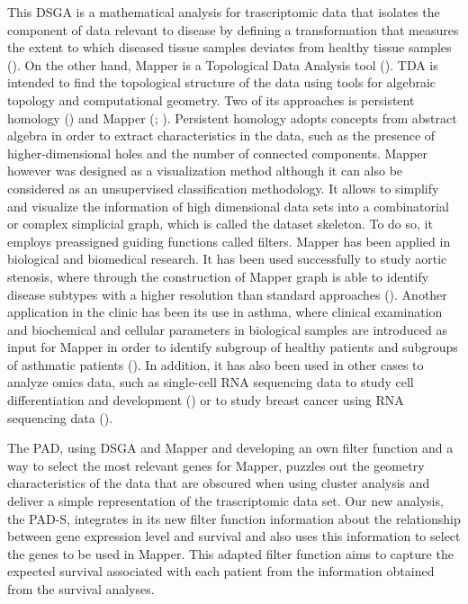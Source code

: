 This DSGA is a mathematical analysis for trascriptomic data that isolates the component of data relevant to disease by defining a transformation that measures the extent to which diseased tissue samples deviates from healthy tissue samples (\citet{Nicolau2007}). On the other hand, Mapper is a Topological Data Analysis tool (\citet{carlsson2009topology}). TDA is intended to find the topological structure of the data using tools for algebraic topology and computational geometry. Two of its approaches is persistent homology (\citet{edelsbrunner2022computational}) and Mapper (\citet{singh2007topological}; \citet{lum2013extracting}). Persistent homology adopts concepts from abstract algebra in order to extract characteristics in the data, such as the presence of higher-dimensional holes and the number of connected components. Mapper however was designed as a visualization method although it can also be considered as an unsupervised classification methodology. It allows to simplify and visualize the information of high dimensional data sets into a combinatorial or complex simplicial graph, which is called the dataset skeleton. To do so, it employs preassigned guiding functions called filters. Mapper has been applied in biological and biomedical research. It has been used successfully to study aortic stenosis, where through the construction of Mapper graph is able to identify disease subtypes with a higher resolution than standard approaches (\citet{casaclang2019network}). Another application in the clinic has been its use in asthma, where clinical examination and biochemical and cellular parameters in biological samples are introduced as input for Mapper in order to identify subgroup of healthy patients and subgroups of asthmatic patients (\citet{hinks2015innate}). In addition, it has also been used in other cases to analyze omics data, such as single-cell RNA sequencing data to study cell differentiation and development (\citet{rizvi2017single}) or to study breast cancer using RNA sequencing data (\citet{mathews2019robust}).

The PAD, using DSGA and Mapper and developing an own filter function and a way to select the most relevant genes for Mapper, puzzles out the geometry characteristics of the data that are obscured when using cluster analysis and deliver a simple representation of the trascriptomic data set. Our new analysis, the PAD-S, integrates in its new filter function information about the relationship between gene expression level and survival and also uses this information to select the genes to be used in Mapper. This adapted filter function aims to capture the expected survival associated with each patient from the information obtained from the survival analyses.

